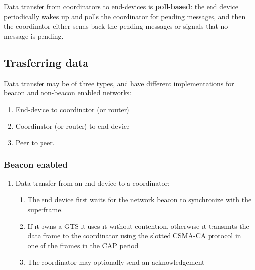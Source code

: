 \begin{itemize}
Data transfer from coordinators to end-devices is
\textbf{poll-based}: the end device periodically wakes up and polls the coordinator for pending messages, and then the coordinator either sends back the pending messages or signals that no message is pending.


\subsection{Trasferring data}
Data transfer may be of three types, and have different implementations for beacon and non-beacon enabled networks:
\begin{enumerate}
   \item End-device to coordinator (or router)
   \item Coordinator (or router) to end-device
   \item Peer to peer.
\end{enumerate}

\newpage
\subsubsection{Beacon enabled}

\begin{enumerate}
   \item Data transfer from an end device to a coordinator:
   \begin{paracol}{2}
      
      \begin{enumerate}
         \item The end device first waits for the network beacon to synchronize with the superframe.
         \item If it owns a GTS it uses it without contention, otherwise it transmits the data frame to the coordinator using the slotted CSMA-CA protocol in one of the frames in the CAP period
         \item The coordinator may optionally send an acknowledgement
      \end{enumerate}

      \switchcolumn


\end{paracol}
\end{enumerate}
\end{itemize}
